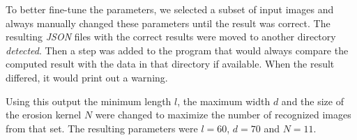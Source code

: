 To better fine-tune the parameters, we selected a subset of input images and
always manually changed these parameters until the result was correct. The
resulting \textit{JSON} files with the correct results were moved to another
directory \textit{detected}. Then a step was added to the program that would
always compare the computed result with the data in that directory if available.
When the result differed, it would print out a warning.

Using this output the minimum length $l$, the maximum width $d$ and the size of
the erosion kernel $N$ were changed to maximize the number of recognized images
from that set. The resulting parameters were $l = 60$, $d = 70$ and $N =11$.
